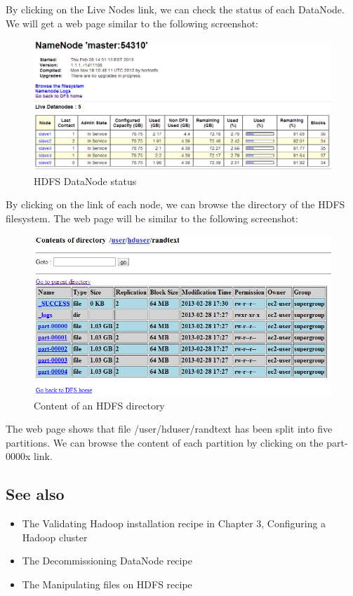 By clicking on the Live Nodes link, we can check the status of each DataNode. We will get a web page similar to the following screenshot:
\begin{figure}[h]
  \centering
  \includegraphics[width=.9\textwidth]{figs/5163OS_04_09.png}
  \caption{HDFS DataNode status}\label{fig:datanode.status}
\end{figure} 

By clicking on the link of each node, we can browse the directory of the HDFS filesystem. The web page will be similar to the following screenshot:

\begin{figure}[h]
  \centering
  \includegraphics[width=.8\textwidth]{figs/5163OS_04_10.png}
  \caption{Content of an HDFS directory}\label{fig:content.hdfs}
\end{figure} 

The web page shows that file /user/hduser/randtext has been split into five partitions. We can browse the content of each partition by clicking on the part-0000x link.

\subsection*{See also}
\begin{itemize}
  \item The Validating Hadoop installation recipe in Chapter 3, Configuring a Hadoop cluster
  \item The Decommissioning DataNode recipe
  \item The Manipulating files on HDFS recipe
\end{itemize}

